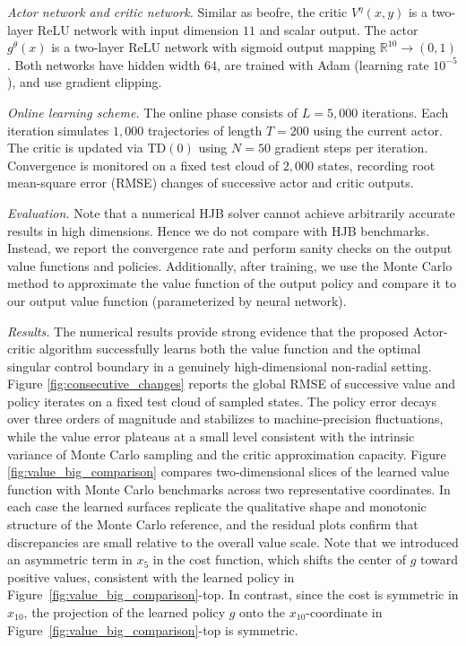 \documentclass[11pt]{amsart}
\theoremstyle{plain}
\numberwithin{equation}{section}
\begin{document}
\medskip


\emph{Actor network and critic network.} Similar as beofre,
 the critic $V^\eta(x,y)$ is a two-layer ReLU network with input dimension $11$ and scalar output. The actor $g^\theta(x)$ is a two-layer ReLU network with sigmoid output mapping $\mathbb{R}^{10}\to(0,1)$. Both networks have hidden width $64$, are trained with Adam (learning rate $10^{-5}$), and use gradient clipping.
\medskip

\emph{Online learning scheme.} The online phase consists of $L=5{,}000$ iterations. Each iteration simulates $1{,}000$ trajectories of length $T=200$ using the current actor. The critic is updated via TD$(0)$ using $N=50$ gradient steps per iteration. Convergence is monitored on a fixed test cloud of $2{,}000$ states, recording root mean-square error (RMSE) changes of successive actor and critic outputs.

\emph{Evaluation.} Note that a numerical HJB solver cannot achieve arbitrarily accurate results in high dimensions. Hence we do not compare with HJB benchmarks. Instead, we report the convergence rate and perform sanity checks on the output value functions and policies. Additionally, after training, we use the Monte Carlo method to approximate the value function of the output policy and compare it to our  output value function (parameterized by neural network).
\medskip


\emph{Results.}
The numerical results provide strong evidence that the proposed Actor-critic algorithm successfully learns both the value function and the optimal singular control boundary in a genuinely high-dimensional non-radial setting. Figure \ref{fig:consecutive_changes} reports the global RMSE of successive value and policy iterates on a fixed test cloud of sampled states. The policy error decays over three orders of magnitude and stabilizes to machine-precision fluctuations, while the value error plateaus at a small level consistent with the intrinsic variance of Monte Carlo sampling and the critic approximation capacity. Figure \ref{fig:value_big_comparison} compares two-dimensional slices of the learned value function with Monte Carlo benchmarks across two representative coordinates. In each case the learned surfaces replicate the qualitative shape and monotonic structure of the Monte Carlo reference, and the residual plots confirm that discrepancies are  small relative to the overall value scale. Note that we introduced an asymmetric term in $x_5$ in the cost function, which shifts the center of 
$g$ toward positive values, consistent with the learned policy in Figure~\ref{fig:value_big_comparison}-top. In contrast, since the cost is symmetric in 
$x_{10}$, the projection of the learned policy $g$ onto the $x_{10}$-coordinate in Figure~\ref{fig:value_big_comparison}-top is symmetric.
\end{document}
